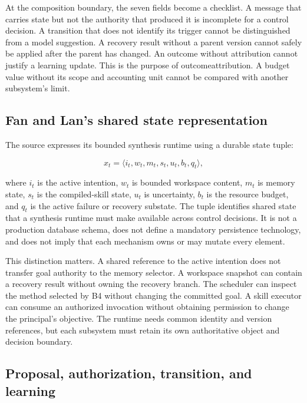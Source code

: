 At the composition boundary, the seven fields become a checklist. A message that carries state but not the authority that produced it is incomplete for a control decision. A transition that does not identify its trigger cannot be distinguished from a model suggestion. A recovery result without a parent version cannot safely be applied after the parent has changed. An outcome without attribution cannot justify a learning update. This is the purpose of \gls{outcomeattribution}. A budget value without its scope and accounting unit cannot be compared with another subsystem's limit.

\subsection{Fan and Lan's shared state representation}
\label{subsec:ch18-shared-state-representation}

The source expresses its bounded synthesis runtime using a durable state tuple:

\[
 x_t = \langle i_t, w_t, m_t, s_t, u_t, b_t, q_t \rangle,
\]

where \(i_t\) is the active intention, \(w_t\) is bounded workspace content, \(m_t\) is memory state, \(s_t\) is the compiled-skill state, \(u_t\) is uncertainty, \(b_t\) is the resource budget, and \(q_t\) is the active failure or recovery substate. The tuple identifies shared state that a synthesis runtime must make available across control decisions. It is not a production database schema, does not define a mandatory persistence technology, and does not imply that each mechanism owns or may mutate every element.

This distinction matters. A shared reference to the active intention does not transfer goal authority to the memory selector. A workspace snapshot can contain a recovery result without owning the recovery branch. The scheduler can inspect the method selected by B4 without changing the committed goal. A skill executor can consume an authorized invocation without obtaining permission to change the principal's objective. The runtime needs common identity and version references, but each subsystem must retain its own authoritative object and decision boundary.

\subsection{Proposal, authorization, transition, and learning}
\label{subsec:ch18-proposal-authorization-transition-learning}

